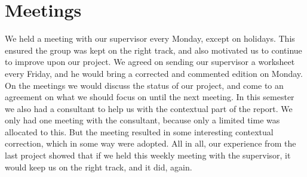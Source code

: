 \section{Meetings}
We held a meeting with our supervisor every Monday, except on holidays. This ensured the group was kept on the right track, and also motivated us to continue to improve upon our project. We agreed on sending our supervisor a worksheet every Friday, and he would bring a corrected and commented edition on Monday. On the meetings we would discuss the status of our project, and come to an agreement on what we should focus on until the next meeting. In this semester we also had a consultant to help us with the contextual part of the report. We only had one meeting with the consultant, because only a limited time was allocated to this. But the meeting resulted in some interesting contextual correction, which in some way were adopted. All in all, our experience from the last project showed that if we held this weekly meeting with the supervisor, it would keep us on the right track, and it did, again. 
